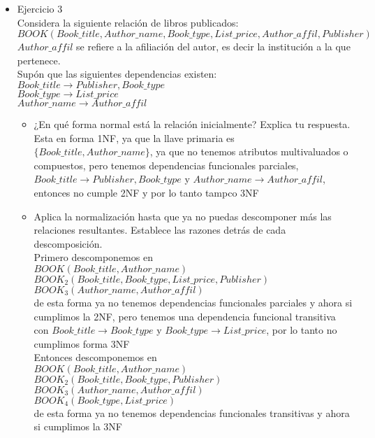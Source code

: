 \documentclass{article}
\begin{document}
\begin{itemize}
\begin{itemize}
    \end{itemize}

    \item Ejercicio 3 \\
    Considera la siguiente relación de libros publicados: \\
    $BOOK (Book\_title , Author\_name , Book\_type , List\_price , Author\_affil, Publisher )$ \\
    $Author\_affil$ se refiere a la afiliación del autor, es decir la institución a la que pertenece. \\
    Supón que las siguientes dependencias existen: \\
    $Book\_title \rightarrow Publisher , Book\_type$ \\
    $Book\_type \rightarrow List\_price$ \\
    $Author\_name \rightarrow Author\_affil$ \\
    \begin{itemize}
        \item ¿En qué forma normal está la relación inicialmente? Explica tu respuesta. \\
        Esta en forma 1NF, ya que la llave primaria es $\{Book\_title, Author\_name\}$, ya que no tenemos atributos multivaluados o compuestos, pero tenemos dependencias funcionales parciales, $Book\_title \rightarrow Publisher , Book\_type$ y $Author\_name \rightarrow Author\_affil$, entonces no cumple 2NF y por lo tanto tampco 3NF \\

        \item Aplica la normalización hasta que ya no puedas descomponer más las relaciones resultantes. Establece las razones detrás de cada descomposición. \\
        Primero descomponemos en \\
        $BOOK (Book\_title, Author\_name)$ \\
        $BOOK_2(Book\_title, Book\_type, List\_price, Publisher)$ \\
        $BOOK_3(Author\_name, Author\_affil)$ \\
        de esta forma ya no tenemos dependencias funcionales parciales y ahora si cumplimos la 2NF, pero tenemos una dependencia funcional transitiva con $Book\_title \rightarrow Book\_type$ y $Book\_type \rightarrow List\_price$, por lo tanto no cumplimos forma 3NF \\
        
        Entonces descomponemos en \\
        $BOOK (Book\_title, Author\_name)$ \\
        $BOOK_2(Book\_title, Book\_type, Publisher)$ \\
        $BOOK_3(Author\_name, Author\_affil)$ \\
        $BOOK_4(Book\_type, List\_price)$ \\
        de esta forma ya no tenemos dependencias funcionales transitivas y ahora si cumplimos la 3NF \\
    \end{itemize}
    
\end{itemize}
\end{document}
